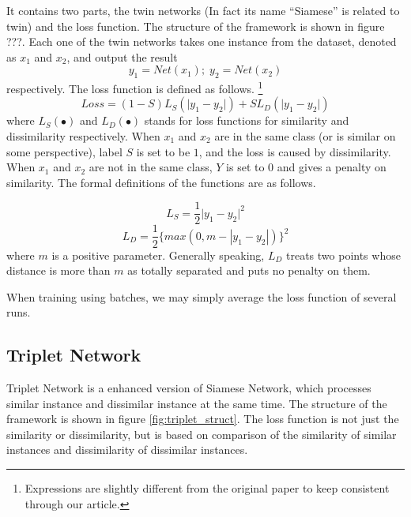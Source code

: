 \documentclass[10pt,twocolumn,letterpaper]{article}
\begin{document}
			It contains two parts, the twin networks (In fact its name ``Siamese'' is related to twin) and the loss function. The structure of the framework is shown in figure ???. Each one of the twin networks takes one instance from the dataset, denoted as $x_1$ and $x_2$, and output the result 
			\begin{equation}
				y_1 = Net(x_1);\; y_2 = Net(x_2)
			\end{equation}
			respectively. The loss function is defined as follows. \footnote{Expressions are slightly different from the original paper to keep consistent through our article.}
			\begin{equation}
				Loss = (1-S)L_S(\lvert y_1 - y_2 \rvert) + S L_D(\lvert y_1 - y_2 \rvert)
			\end{equation}
			where $L_S(\bullet)$ and $L_D(\bullet)$ stands for loss functions for similarity and dissimilarity respectively. When $x_1$ and $x_2$ are in the same class (or is similar on some perspective), label $S$ is set to be $1$, and the loss is caused by dissimilarity. When $x_1$ and $x_2$ are not in the same class, $Y$ is set to $0$ and gives a penalty on similarity. The formal definitions of the functions are as follows.

			\begin{equation}
				L_S = \frac{1}{2}\lvert y_1 - y_2 \rvert^2
			\end{equation}
			\begin{equation}
				L_D = \frac{1}{2}\{max(0, m-|y_1-y_2|)\}^2
			\end{equation}
			where $m$ is a positive parameter. Generally speaking, $L_D$ treats two points whose distance is more than $m$ as totally separated and puts no penalty on them.
			
			When training using batches, we may simply average the loss function of several runs.
		\subsection{Triplet Network}
			Triplet Network is a enhanced version of Siamese Network, which processes similar instance and dissimilar instance at the same time. The structure of the framework is shown in figure \ref{fig:triplet_struct}. The loss function is not just the similarity or dissimilarity, but is based on comparison of the similarity of similar instances and dissimilarity of dissimilar instances. 
			
\end{document}
